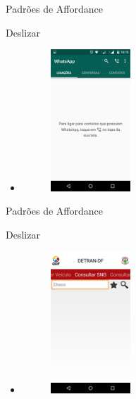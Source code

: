 \begin{frame}{Padrões de Affordance}
\begin{block}{Deslizar}
  \begin{itemize}
    \item<1-> \begin{figure}
    \includegraphics[width=3cm]{figuras/deslize/deslize1}
    \end{figure}
  \end{itemize}
\end{block}
\end{frame}

\begin{frame}{Padrões de Affordance}
\begin{block}{Deslizar}
  \begin{itemize}
    \item<1-> \begin{figure}
    \includegraphics[width=3cm]{figuras/deslize/deslize6}
    \end{figure}
  \end{itemize}
\end{block}
\end{frame}

